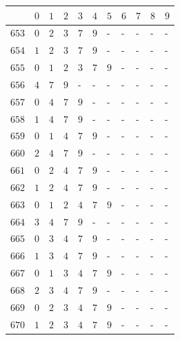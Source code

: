 \begin{appendices}
\begin{table}[H]
  	\label{tab:setbit_22}
  \end{table}
  \begin{table}[H]
  	\centering
  	\begin{tabular} {|l|l|l|l|l|l|l|l|l|l|l|} \hline
  		\backslashbox{$Num$}{$index$} & $ 0 $ & $ 1 $ & $ 2 $ & $ 3 $ & $ 4 $ & $ 5 $ & $ 6 $ & $ 7 $ & $ 8 $ & $ 9 $ \\ \hline
  		$ 653 $ & $ 0 $ &$ 2 $ &$ 3 $ &$ 7 $ &$ 9 $ & - &  - &  - &  - &  -   \\ \hline
  		$ 654 $ & $ 1 $ &$ 2 $ &$ 3 $ &$ 7 $ &$ 9 $ & - &  - &  - &  - &  -   \\ \hline
  		$ 655 $ & $ 0 $ &$ 1 $ &$ 2 $ &$ 3 $ &$ 7 $ &$ 9 $ & - &  - &  - &  -   \\ \hline
  		$ 656 $ & $ 4 $ &$ 7 $ &$ 9 $ & - &  - &  - &  - &  - &  - &  -   \\ \hline
  		$ 657 $ & $ 0 $ &$ 4 $ &$ 7 $ &$ 9 $ & - &  - &  - &  - &  - &  -   \\ \hline
  		$ 658 $ & $ 1 $ &$ 4 $ &$ 7 $ &$ 9 $ & - &  - &  - &  - &  - &  -   \\ \hline
  		$ 659 $ & $ 0 $ &$ 1 $ &$ 4 $ &$ 7 $ &$ 9 $ & - &  - &  - &  - &  -   \\ \hline
  		$ 660 $ & $ 2 $ &$ 4 $ &$ 7 $ &$ 9 $ & - &  - &  - &  - &  - &  -   \\ \hline
  		$ 661 $ & $ 0 $ &$ 2 $ &$ 4 $ &$ 7 $ &$ 9 $ & - &  - &  - &  - &  -   \\ \hline
  		$ 662 $ & $ 1 $ &$ 2 $ &$ 4 $ &$ 7 $ &$ 9 $ & - &  - &  - &  - &  -   \\ \hline
  		$ 663 $ & $ 0 $ &$ 1 $ &$ 2 $ &$ 4 $ &$ 7 $ &$ 9 $ & - &  - &  - &  -   \\ \hline
  		$ 664 $ & $ 3 $ &$ 4 $ &$ 7 $ &$ 9 $ & - &  - &  - &  - &  - &  -   \\ \hline
  		$ 665 $ & $ 0 $ &$ 3 $ &$ 4 $ &$ 7 $ &$ 9 $ & - &  - &  - &  - &  -   \\ \hline
  		$ 666 $ & $ 1 $ &$ 3 $ &$ 4 $ &$ 7 $ &$ 9 $ & - &  - &  - &  - &  -   \\ \hline
  		$ 667 $ & $ 0 $ &$ 1 $ &$ 3 $ &$ 4 $ &$ 7 $ &$ 9 $ & - &  - &  - &  -   \\ \hline
  		$ 668 $ & $ 2 $ &$ 3 $ &$ 4 $ &$ 7 $ &$ 9 $ & - &  - &  - &  - &  -   \\ \hline
  		$ 669 $ & $ 0 $ &$ 2 $ &$ 3 $ &$ 4 $ &$ 7 $ &$ 9 $ & - &  - &  - &  -   \\ \hline
  		$ 670 $ & $ 1 $ &$ 2 $ &$ 3 $ &$ 4 $ &$ 7 $ &$ 9 $ & - &  - &  - &  -   \\ \hline

\end{tabular}
\end{table}
\end{appendices}
